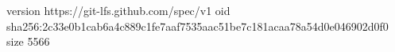version https://git-lfs.github.com/spec/v1
oid sha256:2c33e0b1cab6a4c889c1fe7aaf7535aac51be7c181acaa78a54d0e046902d0f0
size 5566

